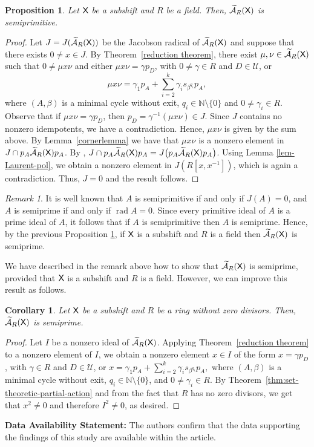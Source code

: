 \documentclass[a4paper,12pt]{amsart}
\newtheorem{proposition}[equation]{Proposition}
\newtheorem{corollary}[equation]{Corollary}
\theoremstyle{definition}
\theoremstyle{remark}
\newtheorem{remark}[equation]{Remark}
\numberwithin{equation}{section}
\newcommand{\osf}{{\normalfont \textsf{X}}}
\newcommand{\ualgshift}{\TCA_R(\osf)}
\newcommand{\N}{\mathbb{N}}
\newcommand{\CA}{\mathcal{A}}
\newcommand{\TCA}{\widetilde{\CA}}
\newcommand{\TCB}{\mathcal{U}}
\begin{document}
\begin{proposition}\label{ecologico} Let $\osf$ be a subshift and $R$ be a field. Then, $\ualgshift$ is semiprimitive.
 \end{proposition}
\begin{proof}
Let $J=J(\ualgshift)$ be the Jacobson radical of $\ualgshift$ and suppose that there exists $0\neq x\in J$.  By 
Theorem~\ref{reduction theorem}, there exist $\mu,\nu\in \ualgshift$ such that  $0\neq \mu x\nu$ and either $\mu x\nu=\gamma p_D$, with $0\neq \gamma\in R$ and $D\in \TCB$, or 
 \[    \mu x\nu=\gamma_1 p_A +\sum\limits_{i=2}^k \gamma_i s_{\beta^{q_i}}p_A,
\]
where $(A,\beta)$ is a minimal cycle without exit, $q_i\in \N\setminus \{0\}$ and $0\neq \gamma_i\in R$. Observe that if $\mu x\nu=\gamma p_D$, then  
$p_D=\gamma^{-1}(\mu x\nu)\in J$. Since $J$ contains no nonzero idempotents, we have a contradiction. Hence, $\mu x\nu$ is given by the sum above. By Lemma~\ref{cornerlemma} we have that $\mu x\nu$ is a nonzero element in $J\cap p_A\ualgshift p_A$. By \cite[\S III.7, Proposition 1]{Jac64}, $J\cap p_A\ualgshift p_A=J\big(p_A\ualgshift p_A\big)$. Using Lemma \ref{lem-Laurent-pol}, we obtain a nonzero element in $J(R[x,x^{-1}])$, which is again a contradiction. Thus, $J=0$ and the result follows.
\end{proof}

\begin{remark}\label{jacare}
    It is well known that $A$ is semiprimitive if and only if $J(A)=0$, and $A$ is semiprime if and only if $\operatorname{rad} A=0$. Since every primitive ideal of $A$ is a prime ideal of $A$, it follows that if $A$ is semiprimitive then $A$ is semiprime. Hence, by the previous Proposition \ref{ecologico}, if  $\osf$ is a subshift and $R$ is a field then $\ualgshift$ is semiprime. 
      \end{remark}

We have described in the remark above how to show that $\ualgshift$ is semiprime, provided that $\osf$ is a subshift and $R$ is a field. However, we can improve this result as follows.

\begin{corollary}\label{banana} Let $\osf$ be a subshift and $R$ be a ring without zero divisors. Then, $\ualgshift$ is semiprime.
\end{corollary}

\begin{proof} Let $I$ be a nonzero ideal of $\ualgshift$. Applying Theorem~\ref{reduction theorem} to a nonzero element of $I$, we obtain a nonzero element $x\in I$ of the form $x=\gamma p_D$, with $\gamma\in R$ and $D\in \TCB$, or 
$x=\gamma_1 p_A +\sum\limits_{i=2}^k \gamma_i s_{\beta^{q_i}}p_A,$
where $(A,\beta)$ is a minimal cycle without exit, $q_i\in \N\setminus \{0\}$, and $0\neq \gamma_i\in R$. By Theorem~\ref{thm:set-theoretic-partial-action} and from the fact that $R$ has no zero divisors, we get that $x^2\neq 0$ and therefore $I^2\neq 0$, as desired.
\end{proof}

{\bf Data Availability Statement:}  The authors confirm that the data supporting the findings of this study are available within the article.



\end{document}
